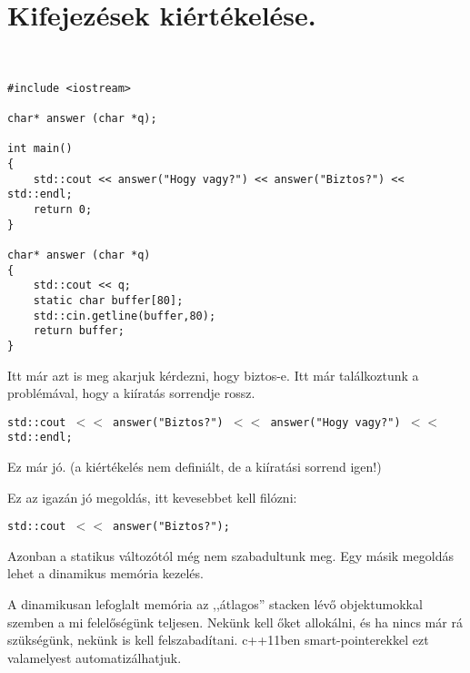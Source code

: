 \documentclass[a4paper,11.5pt]{article}
\begin{document}
	\section{Kifejezések kiértékelése.}
	\begin{example}\ 
		
		\begin{lstlisting}
#include <iostream>

char* answer (char *q);

int main()
{
	std::cout << answer("Hogy vagy?") << answer("Biztos?") << std::endl;
	return 0;
}

char* answer (char *q)
{
	std::cout << q;
	static char buffer[80];
	std::cin.getline(buffer,80);
	return buffer;
}
		\end{lstlisting}
		Itt már azt is meg akarjuk kérdezni, hogy biztos-e. Itt már találkoztunk a problémával, hogy a kiíratás sorrendje rossz. 
		
		\texttt{std::cout $<<$ answer("Biztos?") $<<$ answer("Hogy vagy?") $<<$ std::endl;}
		
		Ez már jó. (a kiértékelés nem definiált, de a kiíratási sorrend igen!)
		
		Ez az igazán jó megoldás, itt kevesebbet kell filózni:
		
		
		\texttt{std::cout $<<$ answer("Biztos?");}
		
	\end{example}
	
	Azonban a statikus változótól még nem szabadultunk meg. Egy másik megoldás lehet a dinamikus memória kezelés.
	\medskip
	
	A dinamikusan lefoglalt memória az ,,átlagos'' stacken lévő objektumokkal szemben a mi felelőségünk teljesen. Nekünk kell őket allokálni, és ha nincs már rá szükségünk, nekünk is kell felszabadítani. c++11ben smart-pointerekkel ezt valamelyest automatizálhatjuk.
		
\end{document}
